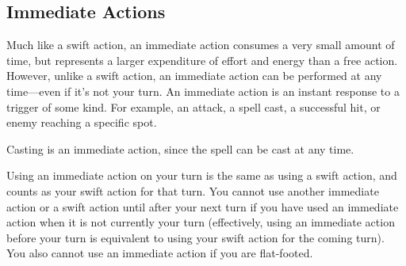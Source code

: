 
\subsection{Immediate Actions}
Much like a swift action, an immediate action consumes a very small amount of time, but represents a larger expenditure of effort and energy than a free action. However, unlike a swift action, an immediate action can be performed at any time---even if it's not your turn. An immediate action is an instant response to a trigger of some kind. For example, an attack, a spell cast, a successful hit, or enemy reaching a specific spot.

Casting  is an immediate action, since the spell can be cast at any time.

Using an immediate action on your turn is the same as using a swift action, and counts as your swift action for that turn. You cannot use another immediate action or a swift action until after your next turn if you have used an immediate action when it is not currently your turn (effectively, using an immediate action before your turn is equivalent to using your swift action for the coming turn). You also cannot use an immediate action if you are flat-footed.
